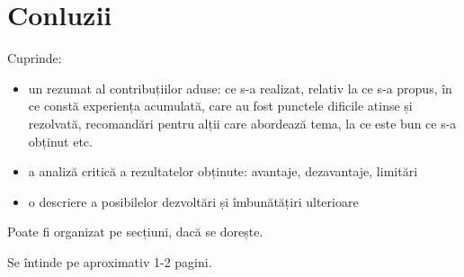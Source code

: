\chapter{Conluzii}
\label{cap:concluzii}

Cuprinde:

\begin{itemize}
 \item un rezumat al contribuțiilor aduse: ce s-a realizat, relativ la ce s-a propus, în ce constă experiența acumulată, care au fost punctele dificile atinse și rezolvată, recomandări pentru alții care abordează tema, la ce este bun ce s-a obținut etc.
 
 \item a analiză critică a rezultatelor obținute: avantaje, dezavantaje, limitări
 
 \item o descriere a posibilelor dezvoltări și îmbunătățiri ulterioare
\end{itemize}

Poate fi organizat pe secțiuni, dacă se dorește.

Se întinde pe aproximativ 1-2 pagini. 









